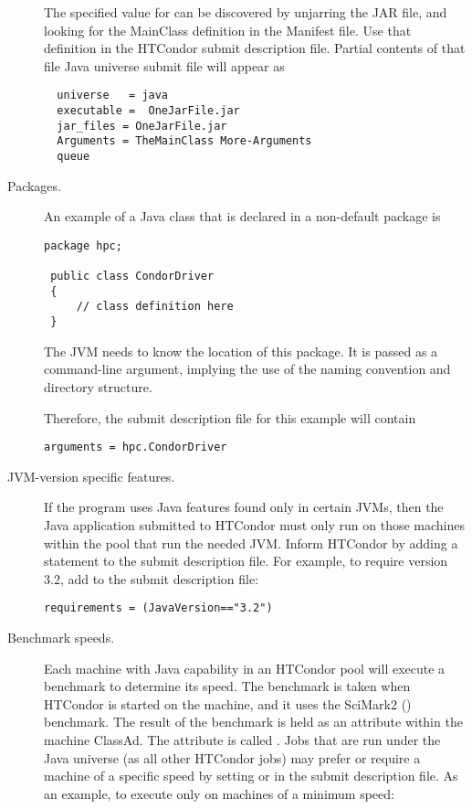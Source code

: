 \begin{description}
The specified value for \verb@TheMainClass@
can be discovered by unjarring the JAR file,
and looking for the MainClass definition in the Manifest file.
Use that definition in the HTCondor submit description file.
Partial contents of that file Java universe submit file will appear as

\begin{verbatim}
  universe   = java
  executable =  OneJarFile.jar
  jar_files = OneJarFile.jar
  Arguments = TheMainClass More-Arguments
  queue 
\end{verbatim}


\item[Packages.]
An example of a Java class that is declared in a non-default
package is
\begin{verbatim}
package hpc;

 public class CondorDriver
 {
     // class definition here
 }
\end{verbatim}
The JVM needs to know the location of this package.
It is passed as a command-line argument, implying the use
of the naming convention and directory structure.

Therefore, the submit description file for this example will contain
\begin{verbatim}
arguments = hpc.CondorDriver
\end{verbatim}

\item[JVM-version specific features.]
If the program uses Java features found only in certain
JVMs, then the Java application submitted to HTCondor
must only run on those machines within the
pool that run the needed JVM.
Inform HTCondor by adding a 
statement to the submit description file.
For example, to require version 3.2, add to the submit description
file:

\begin{verbatim}
requirements = (JavaVersion=="3.2")
\end{verbatim}

\item[Benchmark speeds.]
Each machine with Java capability in an HTCondor pool
will execute a benchmark to determine its speed.
The benchmark is taken when HTCondor is started on
the machine, and it uses the SciMark2
() benchmark.
The result of the benchmark is held as an attribute
within the 
machine ClassAd.
The attribute is called .
Jobs that are run under the Java universe (as all other HTCondor jobs)
may prefer or require a machine of a specific speed
by setting  or  in
the submit description file.
As an example, to execute only on machines of a minimum speed:


\end{description}
